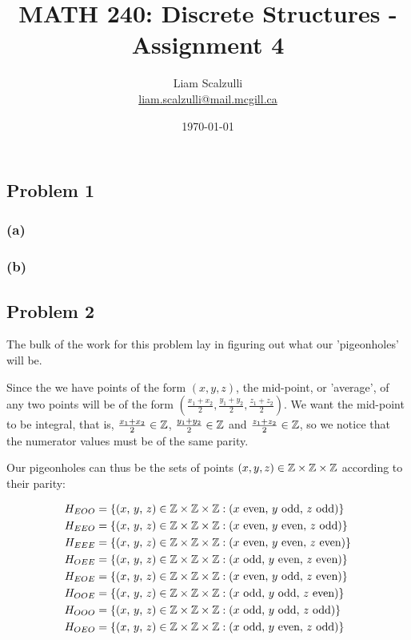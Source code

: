 \documentclass[10pt]{article}
\title{MATH 240: Discrete Structures - Assignment 4}
\author{Liam Scalzulli\\
\href{mailto:liam.scalzulli@mail.mcgill.ca}{liam.scalzulli@mail.mcgill.ca}}
\date{\today}
\begin{document}
\maketitle

\subsection*{Problem 1}

\subsubsection*{(a)}

\subsubsection*{(b)}

\newpage
\subsection*{Problem 2}

The bulk of the work for this problem lay in figuring out
what our 'pigeonholes' will be. 
\spacing

\noindent
Since the we have points of the form $(x, y, z)$, the mid-point, or 'average', of any two 
points will be of the form $(\frac{x_{1} + x_{2}}{2}, \frac{y_{1} + y_{2}}{2}, \frac{z_{1} + z_{2}}{2})$.
We want the mid-point to be integral, that is, $\frac{x_{1} + x_{2}}{2} \in \mathbb{Z}$, 
$\frac{y_{1} + y_{2}}{2} \in \mathbb{Z}$ and $\frac{z_{1} + z_{2}}{2} \in \mathbb{Z}$, so we notice that the numerator
values must be of the same parity.
\spacing

\noindent
Our pigeonholes can thus be the sets of points $(x, y, z) \in \mathbb{Z} \times \mathbb{Z} \times \mathbb{Z}$ according to their parity:
\vspace*{-15pt}

\begin{align*}
  H_{EOO} &= \{\text{($x$, $y$, $z$)} \in \mathbb{Z} \times \mathbb{Z} \times \mathbb{Z} : (x \text{ even, } y \text{ odd,  } z \text{ odd})\}  \\
  H_{EEO} &= \{\text{($x$, $y$, $z$)} \in \mathbb{Z} \times \mathbb{Z} \times \mathbb{Z} : (x \text{ even, } y \text{ even, } z \text{ odd})\}  \\
  H_{EEE} &= \{\text{($x$, $y$, $z$)} \in \mathbb{Z} \times \mathbb{Z} \times \mathbb{Z} : (x \text{ even, } y \text{ even, } z \text{ even})\} \\
  H_{OEE} &= \{\text{($x$, $y$, $z$)} \in \mathbb{Z} \times \mathbb{Z} \times \mathbb{Z} : (x \text{ odd,  } y \text{ even, } z \text{ even})\} \\
  H_{EOE} &= \{\text{($x$, $y$, $z$)} \in \mathbb{Z} \times \mathbb{Z} \times \mathbb{Z} : (x \text{ even, } y \text{ odd,  } z \text{ even})\} \\
  H_{OOE} &= \{\text{($x$, $y$, $z$)} \in \mathbb{Z} \times \mathbb{Z} \times \mathbb{Z} : (x \text{ odd,  } y \text{ odd,  } z \text{ even})\} \\
  H_{OOO} &= \{\text{($x$, $y$, $z$)} \in \mathbb{Z} \times \mathbb{Z} \times \mathbb{Z} : (x \text{ odd,  } y \text{ odd,  } z \text{ odd})\}  \\
  H_{OEO} &= \{\text{($x$, $y$, $z$)} \in \mathbb{Z} \times \mathbb{Z} \times \mathbb{Z} : (x \text{ odd,  } y \text{ even, } z \text{ odd})\}
\end{align*}
\end{document}
